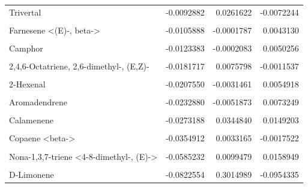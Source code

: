 \documentclass[12pt,final,CPage]{ufthesis}
\begin{document}
{\begin{table}
{\begin{tabular}[t]{lrrr}
  Trivertal & -0.0092882 & 0.0261622 & -0.0072244\\
  \cellcolor{gray!6}{5-Hepten-2-one, <6-methyl->} & \cellcolor{gray!6}{-0.0103809} & \cellcolor{gray!6}{0.0313532} & \cellcolor{gray!6}{-0.0115541}\\
  Farnesene <(E)-, beta-> & -0.0105888 & -0.0001787 & 0.0043130\\
  \cellcolor{gray!6}{Nerolidol} & \cellcolor{gray!6}{-0.0108202} & \cellcolor{gray!6}{-0.0010233} & \cellcolor{gray!6}{0.0035165}\\
  Camphor & -0.0123383 & -0.0002083 & 0.0050256\\
  \addlinespace
  \cellcolor{gray!6}{unknown} & \cellcolor{gray!6}{-0.0181488} & \cellcolor{gray!6}{-0.0003063} & \cellcolor{gray!6}{0.0073923}\\
  2,4,6-Octatriene, 2,6-dimethyl-, (E,Z)- & -0.0181717 & 0.0075798 & -0.0011537\\
  \cellcolor{gray!6}{Caryophyllene <9-epi-(E)->} & \cellcolor{gray!6}{-0.0205377} & \cellcolor{gray!6}{0.0115902} & \cellcolor{gray!6}{-0.0028174}\\
  2-Hexenal & -0.0207550 & -0.0031461 & 0.0054918\\
  \cellcolor{gray!6}{Ocimene, <trans-beta->} & \cellcolor{gray!6}{-0.0210164} & \cellcolor{gray!6}{0.0047960} & \cellcolor{gray!6}{0.0027111}\\
  \addlinespace
  Aromadendrene & -0.0232880 & -0.0051873 & 0.0073249\\
  \cellcolor{gray!6}{Humulene} & \cellcolor{gray!6}{-0.0252997} & \cellcolor{gray!6}{0.0082004} & \cellcolor{gray!6}{-0.0020543}\\
  Calamenene & -0.0273188 & 0.0344840 & 0.0149203\\
  \cellcolor{gray!6}{Cadinene <delta->} & \cellcolor{gray!6}{-0.0319648} & \cellcolor{gray!6}{-0.0075670} & \cellcolor{gray!6}{0.0026733}\\
  Copaene <beta-> & -0.0354912 & 0.0033165 & -0.0017522\\
  \addlinespace
  \cellcolor{gray!6}{3-Hexen-1-ol, (Z)-} & \cellcolor{gray!6}{-0.0571536} & \cellcolor{gray!6}{-0.0073374} & \cellcolor{gray!6}{0.0329533}\\
  Nona-1,3,7-triene <4-8-dimethyl-, (E)-> & -0.0585232 & 0.0099479 & 0.0158949\\
  \cellcolor{gray!6}{Germacrene D} & \cellcolor{gray!6}{-0.0740663} & \cellcolor{gray!6}{0.0102778} & \cellcolor{gray!6}{-0.0027056}\\
  D-Limonene & -0.0822554 & 0.3014989 & -0.0954335\\

\end{tabular}}
\end{table}}
\end{document}
